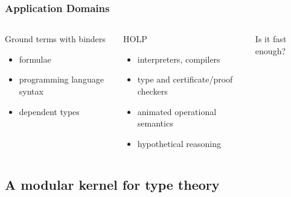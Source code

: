 \documentclass{beamer}
\begin{document}
\begin{frame}[fragile]
 \frametitle{Application Domains}
 \begin{columns}[c]
  \begin{block}{Ground terms with binders}
   \begin{itemize}
    \item formulae
    \item programming language syntax
    \item dependent types
   \end{itemize}
  \end{block}
  \begin{block}{HOLP}
   \begin{itemize}
    \item interpreters, compilers
    \item \alert{type and certificate/proof checkers}
    \item animated operational semantics
    \item hypothetical reasoning
   \end{itemize}
  \end{block}
   \alert{\Large Is it fast enough?}
 \end{columns}
\end{frame}

\subsection{A modular kernel for type theory}
\end{document}
